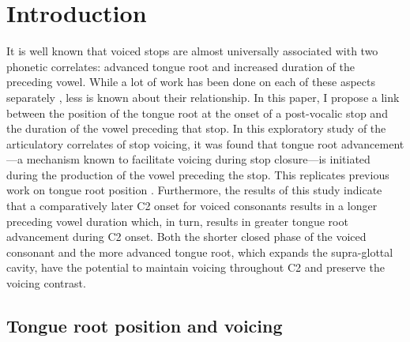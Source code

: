 \documentclass[preprint]{JASAnew}
\begin{document}

\maketitle




\hypertarget{introduction}{%
\section{Introduction}\label{introduction}}

\label{s:intro}

It is well known that voiced stops are almost universally associated
with two phonetic correlates: advanced tongue root and increased
duration of the preceding vowel. While a lot of work has been done on
each of these aspects separately
\citep{kent1969, perkell1969, westbury1983, rothenberg1967, ahn2018, house1953, peterson1960, chen1970, klatt1973, lisker1974, farnetani1986, fowler1992},
less is known about their relationship. In this paper, I propose a link
between the position of the tongue root at the onset of a post-vocalic
stop and the duration of the vowel preceding that stop. In this
exploratory study of the articulatory correlates of stop voicing, it was
found that tongue root advancement---a mechanism known to facilitate
voicing during stop closure---is initiated during the production of the
vowel preceding the stop. This replicates previous work on tongue root
position
\citep{kent1969, perkell1969, westbury1983, rothenberg1967, ahn2018}.
Furthermore, the results of this study indicate that a comparatively
later C2 onset for voiced consonants results in a longer preceding vowel
duration which, in turn, results in greater tongue root advancement
during C2 onset. Both the shorter closed phase of the voiced consonant
and the more advanced tongue root, which expands the supra-glottal
cavity, have the potential to maintain voicing throughout C2 and
preserve the voicing contrast.

\hypertarget{tongue-root-position-and-voicing}{%
\subsection{Tongue root position and
voicing}\label{tongue-root-position-and-voicing}}
\end{document}
